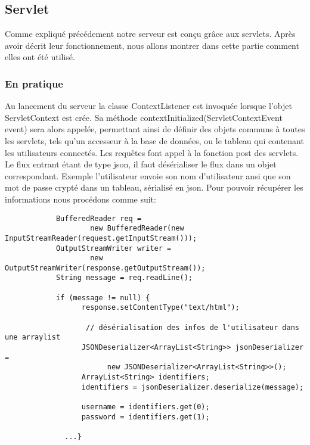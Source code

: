 
		
	
		
\subsection{Servlet}
	
		Comme expliqué précédement notre serveur est conçu grâce aux \glspl{servlet}.
		Après avoir décrit leur fonctionnement, nous allons montrer dans cette partie
		comment elles ont été utilisé.
		
	\subsubsection{En pratique}
		Au lancement du serveur la classe ContextListener est invoquée lorsque l'objet
		ServletContext est crée. Sa méthode contextInitialized(ServletContextEvent event) sera alors appelée, 
		permettant ainsi de définir des objets communs à toutes les
		\glspl{servlet}, tels qu'un accesseur à la base de données, ou le tableau qui
		contenant les utilisateurs connectés. Les requêtes font appel à la fonction
		post des \glspl{servlet}. Le flux entrant étant de type \gls{json}, il faut
		désérialiser le flux dans un objet correspondant. Exemple l'utilisateur envoie son nom d'utilisateur ansi que son mot de passe crypté
		dans un tableau, sérialisé en \gls{json}.
		Pour pouvoir récupérer les informations nous procédons comme suit: 
		
		\begin{verbatim}
			BufferedReader req = 
				    new BufferedReader(new InputStreamReader(request.getInputStream()));
			OutputStreamWriter writer = 
				    new OutputStreamWriter(response.getOutputStream());
			String message = req.readLine();
			
			if (message != null) {
				  response.setContentType("text/html");
				
				   // désérialisation des infos de l'utilisateur dans une arraylist 
				  JSONDeserializer<ArrayList<String>> jsonDeserializer = 
					    new JSONDeserializer<ArrayList<String>>();
				  ArrayList<String> identifiers;
				  identifiers = jsonDeserializer.deserialize(message);
				
				  username = identifiers.get(0);
				  password = identifiers.get(1);
				  
			  ...}
		\end{verbatim}
		
